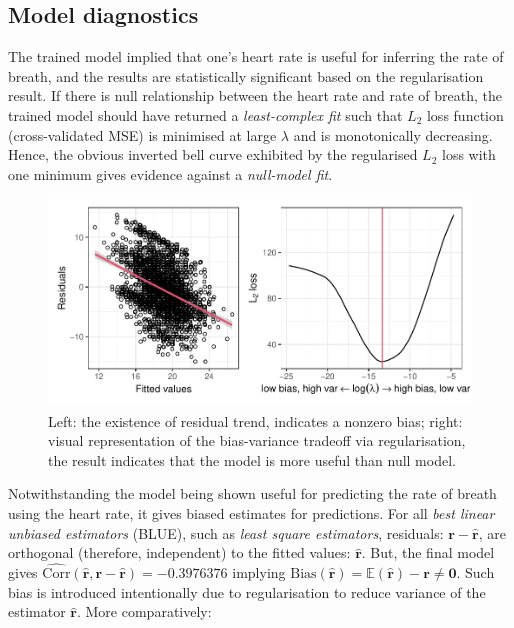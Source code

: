 \documentclass[
]{article}
\begin{document}
\hypertarget{model-diagnostics}{%
\subsection{Model diagnostics}\label{model-diagnostics}}

The trained model implied that one's heart rate is useful for inferring
the rate of breath, and the results are statistically significant based
on the regularisation result. If there is null relationship between the
heart rate and rate of breath, the trained model should have returned a
\emph{least-complex fit} such that \(L_2\) loss function
(cross-validated MSE) is minimised at large \(\lambda\) and is
monotonically decreasing. Hence, the obvious inverted bell curve
exhibited by the regularised \(L_2\) loss with one minimum gives
evidence against a \emph{null-model fit}.

\begin{figure}

{\centering \includegraphics{report_files/figure-latex/resid-check-1} 

}

\caption{Left: the existence of residual trend, indicates a nonzero bias; right: visual representation of the bias-variance tradeoff via regularisation, the result indicates that the model is more useful than null model.}\label{fig:resid-check}
\end{figure}

Notwithstanding the model being shown useful for predicting the rate of
breath using the heart rate, it gives biased estimates for predictions.
For all \emph{best linear unbiased estimators} (BLUE), such as
\emph{least square estimators}, residuals:
\(\mathbf{r} - \mathbf{\hat{r}}\), are orthogonal (therefore,
independent) to the fitted values: \(\mathbf{\hat{r}}\). But, the final
model gives
\(\hat{\text{Corr}}(\mathbf{\hat{r}}, \mathbf{r} - \mathbf{\hat{r}}) = -0.3976376\)
implying
\(\text{Bias}(\mathbf{\hat{r}}) = \mathbb{E}(\mathbf{\hat{r}}) - \mathbf{r} \neq \mathbf{0}\).
Such bias is introduced intentionally due to regularisation to reduce
variance of the estimator \(\mathbf{\hat{r}}\). More comparatively:
\end{document}
